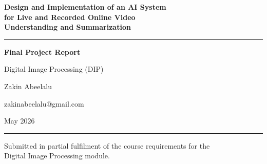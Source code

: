 \documentclass[12pt,a4paper]{article}
\begin{document}
\begin{titlepage}
  \centering
  \vspace*{2cm}
  {\Huge\bfseries Design and Implementation of an AI System\\[0.4em]
  for Live and Recorded Online Video\\[0.4em]
  Understanding and Summarization\par}
  \vspace{1.5cm}
  \rule{\linewidth}{0.5pt}
  \vspace{0.8cm}

  {\large\textbf{Final Project Report}\par}
  \vspace{0.4cm}
  {\large Digital Image Processing (DIP)\par}
  \vspace{1.2cm}

  {\Large Zakin Abeelalu\par}
  \vspace{0.4cm}
  {\large zakinabeelalu@gmail.com\par}
  \vspace{1cm}

  {\large May 2026\par}
  \vfill
  \rule{\linewidth}{0.5pt}
  {\small Submitted in partial fulfilment of the course requirements for the\\
  Digital Image Processing module.}
\end{titlepage}
\end{document}
